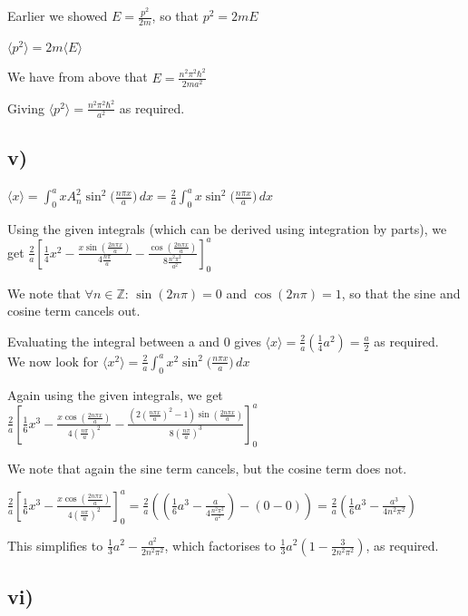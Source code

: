 \documentclass{article}
\begin{document}
Earlier we showed $E=\frac{p^2}{2m}$, so that $p^2 = 2mE$

$\langle p^2 \rangle = 2m \langle E \rangle$

We have from above that $E = \frac{n^2\pi^2\hbar^2}{2ma^2}$

Giving $\langle p^2 \rangle = \frac{n^2\pi^2\hbar^2}{a^2}$ as required.


\subsection*{v)}

$\langle x \rangle = \int_0^a xA_n^2\sin^2{(\frac{n\pi x}{a}})  \,dx
= \frac{2}{a} \int_0^a x\sin^2{(\frac{n\pi x}{a}}) \,dx$

Using the given integrals (which can be derived using integration by parts), we get $\frac{2}{a} \left[ \frac{1}{4}x^2 - \frac{x\sin({\frac{2n\pi x}{a}})}{4\frac{n\pi}{a}} - \frac{\cos({\frac{2n\pi x}{a}})}{8\frac{n^2\pi^2}{a^2}} \right]_0^a$

We note that $\forall n \in \mathbb{Z}$: $\sin(2n\pi)=0$ and $\cos(2n\pi)=1$, so that the sine and cosine term cancels out.

Evaluating the integral between a and 0 gives $\langle x \rangle = \frac{2}{a}(\frac{1}{4}a^2) = \frac{a}{2}$ as required.
\\

We now look for $\langle x^2 \rangle = \frac{2}{a} \int_0^a x^2\sin^2{(\frac{n\pi x}{a}}) \,dx$

Again using the given integrals, we get $\frac{2}{a} \left[ \frac{1}{6}x^3 - \frac{x\cos({\frac{2n\pi x}{a}})}{4(\frac{n\pi}{a})^2} - \frac{(2(\frac{n\pi x}{a})^2-1) \sin({\frac{2n\pi x}{a}})}{8(\frac{n\pi}{a})^3} \right]_0^a$

We note that again the sine term cancels, but the cosine term does not.

$\frac{2}{a} \left[ \frac{1}{6}x^3 - \frac{x\cos({\frac{2n\pi x}{a}})}{4(\frac{n\pi}{a})^2} \right]_0^a 
= \frac{2}{a}((\frac{1}{6}a^3 - \frac{a}{4\frac{n^2\pi^2}{a^2}}) - (0 -0)) = \frac{2}{a}(\frac{1}{6}a^3 - \frac{a^3}{4n^2\pi^2})$

This simplifies to $\frac{1}{3}a^2-\frac{a^2}{2n^2\pi^2}$, which factorises to $\frac{1}{3}a^2(1-\frac{3}{2n^2\pi^2})$, as required.

\subsection*{vi)}
\end{document}
